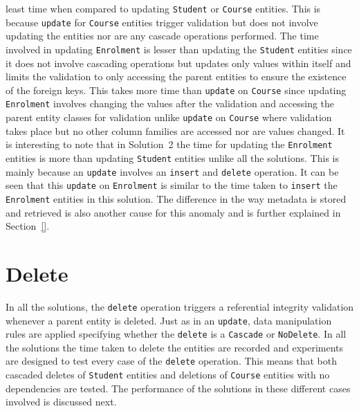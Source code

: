 least time when compared to updating \texttt{Student} or \texttt{Course}
entities.
This is because \texttt{update} for \texttt{Course} entities trigger validation
but does not involve updating the entities nor are any cascade operations performed.
The time involved in updating \texttt{Enrolment} is lesser than updating the
\texttt{Student} entities since it does not involve cascading operations but
updates only values within itself and limits the validation to only accessing
the parent entities to ensure the existence of the foreign keys. This takes more
time than \texttt{update} on \texttt{Course} since updating \texttt{Enrolment}
involves changing the values after the validation and accessing the parent
entity classes for validation unlike \texttt{update} on \texttt{Course} where
validation takes place but no other column families are accessed nor are values
changed. It is interesting to note that in 	Solution~2 the time for updating the
\texttt{Enrolment} entities is more than updating \texttt{Student} entities
unlike all the solutions. This is mainly because an \texttt{update} involves an
\texttt{insert} and \texttt{delete} operation. It can be seen that this
\texttt{update} on \texttt{Enrolment} is similar to the time taken to
\texttt{insert} the \texttt{Enrolment} entities in this solution. The difference
in the way metadata is stored and retrieved is also another cause for this
anomaly and is further explained in Section~\ref{}.


\section{Delete}\label{sr:delete}
In all the solutions, the \texttt{delete} operation triggers a referential
integrity validation whenever a parent entity is deleted. Just as in an
\texttt{update}, data manipulation rules are  applied specifying whether the
\texttt{delete} is a \texttt{Cascade} or \texttt{NoDelete}. In all the solutions
the time taken to delete the entities  are recorded and experiments are designed
to test every case of the \texttt{delete} operation. This means that both
cascaded deletes of \texttt{Student} entities and deletions of
\texttt{Course} entities with no dependencies are tested. The performance of the
solutions in these different cases involved is discussed next.


